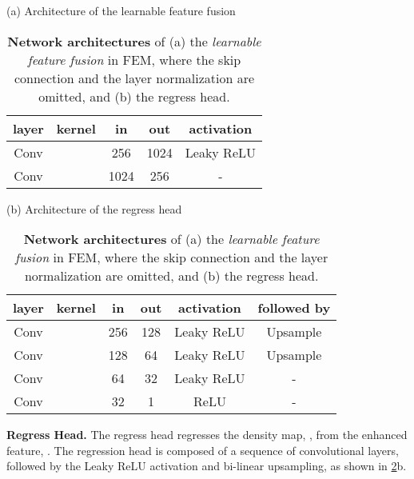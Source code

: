 \documentclass[10pt,twocolumn,letterpaper]{article}
\begin{document}
\begin{table}[t]
    \caption{
        \textbf{Network architectures} of (a) the \textit{learnable feature fusion} in FEM, where the skip connection and the layer normalization are omitted, and (b) the regress head. 
    }
    \vspace{8pt}
    \label{appendix:tab:conv}
    \scriptsize
    \begin{minipage}[t]{0.5\textwidth}
    \setlength\tabcolsep{8pt}
    \centering
    (a) Architecture of the learnable feature fusion \\
    \vspace{3pt}
    \begin{tabular}{ccccc}
        \toprule
        layer & kernel & in & out & activation \\
        \midrule
        Conv   &  & 256 & 1024 & Leaky ReLU \\
        \midrule
        Conv   &  & 1024 & 256 & - \\
        \bottomrule
    \end{tabular}
    \end{minipage}
    \vfill
    \vspace{8pt}
    \begin{minipage}[t]{0.5\textwidth}
    \setlength\tabcolsep{6pt}
    \centering
    (b) Architecture of the regress head \\
    \vspace{3pt}
    \begin{tabular}{cccccc}
    \toprule
        layer & kernel & in & out & activation & followed by \\
        \midrule
        Conv &  & 256 & 128 & Leaky ReLU & Upsample \\
        \midrule
        Conv &  & 128 & 64 & Leaky ReLU & Upsample \\
        \midrule
        Conv &  & 64 & 32 & Leaky ReLU & - \\
        \midrule
        Conv &  & 32 & 1  & ReLU & - \\
        \bottomrule
    \end{tabular}
    \end{minipage}
\end{table}


\vspace{2pt}\noindent\textbf{Regress Head.} The regress head regresses the density map, , from the enhanced feature, . 
The regression head is composed of a sequence of convolutional layers, followed by the Leaky ReLU activation and bi-linear upsampling, as shown in \cref{appendix:tab:conv}b. 
\end{document}
